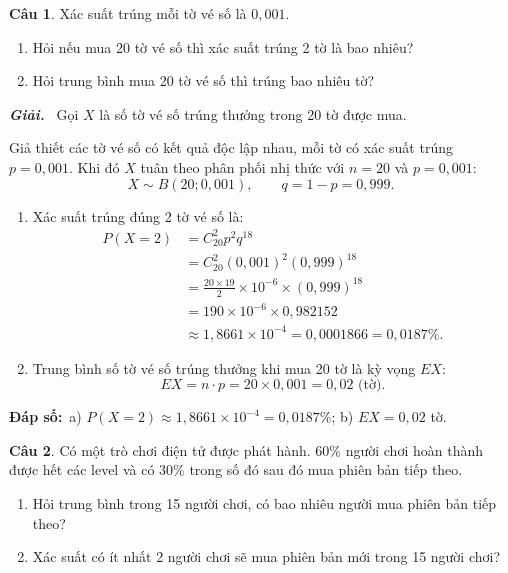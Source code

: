 \documentclass[12pt,a4paper]{article}
\theoremstyle{definition}
\newtheorem{cau}{Câu}
\newcommand{\giai}{\noindent\textbf{\textit{Giải.}}\ }
\newcommand{\dapso}[1]{\noindent\textbf{Đáp số:}\ #1}
\begin{document}
\vspace{1.5em}
\begin{cau}
Xác suất trúng mỗi tờ vé số là $0{,}001$.
\begin{enumerate}[label=\alph*)]
    \item Hỏi nếu mua 20 tờ vé số thì xác suất trúng 2 tờ là bao nhiêu?
    \item Hỏi trung bình mua 20 tờ vé số thì trúng bao nhiêu tờ?
\end{enumerate}
\end{cau}

\giai
Gọi $X$ là số tờ vé số trúng thưởng trong 20 tờ được mua.

Giả thiết các tờ vé số có kết quả độc lập nhau, mỗi tờ có xác suất trúng $p = 0{,}001$. Khi đó $X$ tuân theo phân phối nhị thức với $n = 20$ và $p = 0{,}001$:
\[
X \sim B(20; 0{,}001), \qquad q = 1 - p = 0{,}999.
\]
\begin{enumerate}[label=\alph*)]
    \item Xác suất trúng đúng 2 tờ vé số là:
    \begin{align*}
    P(X = 2) &= C_{20}^2 p^2 q^{18} \\
    &= C_{20}^2 (0{,}001)^2 (0{,}999)^{18} \\
    &= \frac{20 \times 19}{2} \times 10^{-6} \times (0{,}999)^{18} \\
    &= 190 \times 10^{-6} \times 0{,}982152 \\
    &\approx 1{,}8661 \times 10^{-4} = 0{,}0001866 = 0{,}0187\%.
    \end{align*}

    \item Trung bình số tờ vé số trúng thưởng khi mua 20 tờ là kỳ vọng $EX$:
    \[
    EX = n \cdot p = 20 \times 0{,}001 = 0{,}02\text{ (tờ)}.
    \]
\end{enumerate}

\dapso{a) $P(X = 2) \approx 1{,}8661 \times 10^{-4} = 0{,}0187\%$; \quad b) $EX = 0{,}02$ tờ.}

\vspace{1.5em}
\begin{cau}
Có một trò chơi điện tử được phát hành. $60\%$ người chơi hoàn thành được hết các level và có $30\%$ trong số đó sau đó mua phiên bản tiếp theo.
\begin{enumerate}[label=\alph*)]
    \item Hỏi trung bình trong 15 người chơi, có bao nhiêu người mua phiên bản tiếp theo?
    \item Xác suất có ít nhất 2 người chơi sẽ mua phiên bản mới trong 15 người chơi?
\end{enumerate}
\end{cau}
\end{document}
